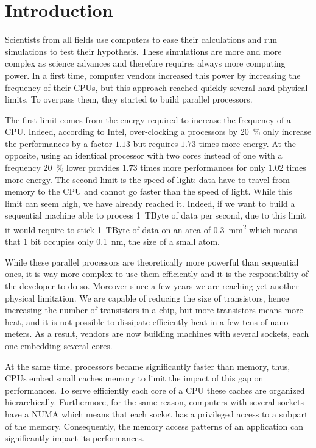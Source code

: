 \chapter{Introduction}

Scientists from all fields use computers to ease their calculations and run simulations to test their hypothesis.
These simulations are more and more complex as science advances and therefore requires always more computing power.
In a first time, computer vendors increased this power by increasing the frequency of their \glspl{CPU}, but this approach reached quickly several hard physical limits.
To overpass them, they started to build parallel processors.

The first limit comes from the energy required to increase the frequency of a \gls{CPU}.
Indeed, according to \gls{Intel}, over-clocking a processors by \SI{20}{\%} only increase the performances by a factor $1.13$ but requires $1.73$ times more energy.
At the opposite, using an identical processor with two cores instead of one with a frequency \SI{20}{\%} lower provides $1.73$ times more performances for only $1.02$ times more energy.
The second limit is the speed of light: data have to travel from memory to the \gls{CPU} and cannot go faster than the speed of light.
While this limit can seem high, we have already reached it.
Indeed, if we want to build a sequential machine able to process \SI{1}{TByte} of data per second, due to this limit it would require  to stick \SI{1}{TByte} of data on an area of \SI{0.3}{mm^2} which means that $1$ bit occupies only \SI{0.1}{nm}, the size of a small atom.

While these parallel processors are theoretically more powerful than sequential ones, it is way more complex to use them efficiently and it is the responsibility of the developer to do so.
Moreover since a few years we are reaching yet another physical limitation.
We are capable of reducing the size of transistors, hence increasing the number of transistors in a chip, but more transistors means more heat, and it is not possible to dissipate efficiently heat in a few tens of nano meters.
As a result, vendors are now building machines with several sockets, each one embedding several cores.

At the same time, processors became significantly faster than memory, thus, \glspl{CPU} embed small caches memory to limit the impact of this gap on performances.
To serve efficiently each core of a \gls{CPU} these caches are organized hierarchically.
Furthermore, for the same reason, computers with several sockets have a \gls{NUMA} which means that each socket has a privileged access to a subpart of the memory.
Consequently, the memory access patterns of an application can significantly impact its performances.

